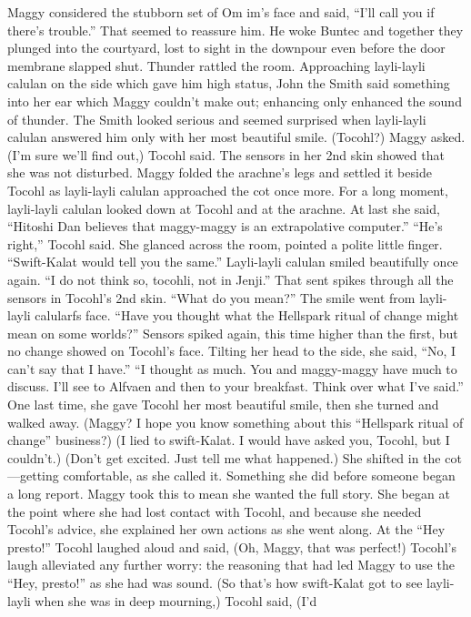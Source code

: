 \documentclass[9pt]{article}
\begin{document}
Maggy considered the stubborn set of Om im’s face and said, “I’ll call you if there’s trouble.”
That seemed to reassure him. He woke Buntec and together they plunged into the courtyard, lost to
sight in the downpour even before the door membrane slapped shut. Thunder rattled the room.
Approaching layli-layli calulan on the side which gave him high status, John the Smith said
something into her ear which Maggy couldn’t make out; enhancing only enhanced the sound of thunder.
The Smith looked serious and seemed surprised when layli-layli calulan answered him only with her
most beautiful smile.
(Tocohl?) Maggy asked.
(I’m sure we’ll find out,) Tocohl said. The sensors in her 2nd skin showed that she was not
disturbed. Maggy folded the arachne’s legs and settled it beside Tocohl as layli-layli calulan
approached the cot once more.
For a long moment, layli-layli calulan looked down at Tocohl and at the arachne. At last she said,
“Hitoshi Dan believes that maggy-maggy is an extrapolative computer.”
“He’s right,” Tocohl said. She glanced across the room, pointed a polite little finger. “Swift-Kalat
would tell you the same.”
Layli-layli calulan smiled beautifully once again. “I do not think so, tocohli, not in Jenji.”
That sent spikes through all the sensors in Tocohl’s 2nd skin. “What do you mean?”
The smile went from layli-layli calularfs face. “Have you thought what the Hellspark ritual of change
might mean on some worlds?”
Sensors spiked again, this time higher than the first, but no change showed on Tocohl’s face. Tilting
her head to the side, she said, “No, I can’t say that I have.”
“I thought as much. You and maggy-maggy have much to discuss. I’ll see to Alfvaen and then to
your breakfast. Think over what I’ve said.” One last time, she gave Tocohl her most beautiful smile, then
she turned and walked away.
(Maggy? I hope you know something about this “Hellspark ritual of change” business?)
(I lied to swift-Kalat. I would have asked you, Tocohl, but I couldn’t.)
(Don’t get excited. Just tell me what happened.) She shifted in the cot—getting comfortable, as she
called it. Something she did before someone began a long report.
Maggy took this to mean she wanted the full story. She began at the point where she had lost contact
with Tocohl, and because she needed Tocohl’s advice, she explained her own actions as she went along.
At the “Hey presto!” Tocohl laughed aloud and said, (Oh, Maggy, that was perfect!)
Tocohl’s laugh alleviated any further worry: the reasoning that had led Maggy to use the “Hey,
presto!” as she had was sound.
(So that’s how swift-Kalat got to see layli-layli when she was in deep mourning,) Tocohl said, (I’d
\end{document}
